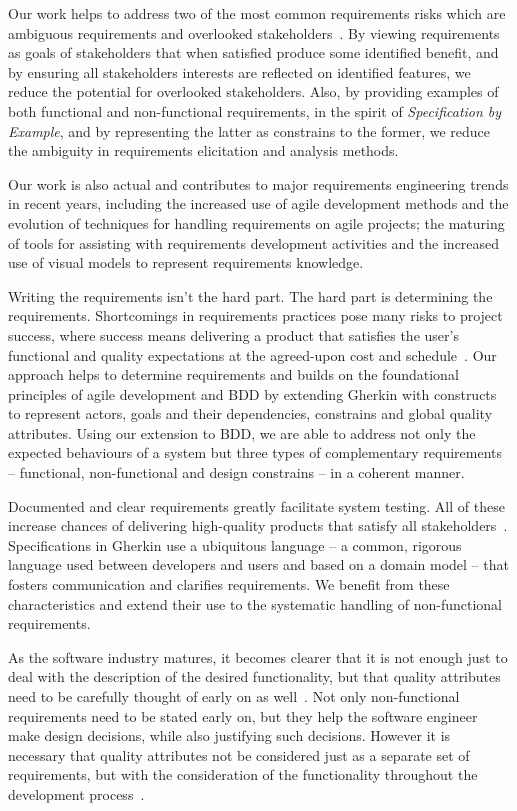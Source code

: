 \documentclass[dissertation,final]{softeng}
\newcommand{\nfrs}{non-functional requirements\xspace}
\begin{document}
Our work helps to address two of the most common requirements risks which are ambiguous requirements and overlooked stakeholders~\citep[p. 20]{Wiegers2013}. By viewing requirements as goals of stakeholders that when satisfied produce some identified benefit, and by ensuring all stakeholders interests are reflected on identified features, we reduce the potential for overlooked stakeholders. Also, by providing examples of both functional and \nfrs, in the spirit of \emph{Specification by Example}, and by representing the latter as constrains to the former, we reduce the ambiguity in requirements elicitation and analysis methods.

Our work is also actual and contributes to major requirements engineering trends in recent years, including the increased use of agile development methods and the evolution of techniques for handling requirements on agile projects; the maturing of tools for assisting with requirements development activities and the increased use of visual models to represent requirements knowledge.

Writing the requirements isn't the hard part. The hard part is determining the requirements. Shortcomings in requirements practices pose many risks to project success, where success means delivering a product that satisfies the user's functional and quality expectations at the agreed-upon cost and schedule~\citep{Wiegers2013}. Our approach helps to determine requirements and builds on the foundational principles of agile development and BDD by extending Gherkin with constructs to represent actors, goals and their dependencies, constrains and global quality attributes. Using our extension to BDD, we are able to address not only the expected behaviours of a system but three types of complementary requirements~\citep{Leffingwell2011} -- functional, non-functional and design constrains -- in a coherent manner.

Documented and clear requirements greatly facilitate system testing. All of these increase chances of delivering high-quality products that satisfy all stakeholders~\citep{Wiegers2013}. Specifications in Gherkin use a ubiquitous language -- a common, rigorous language used between developers and users and based on a domain model -- that fosters communication and clarifies requirements. We benefit from these characteristics and extend their use to the systematic handling of \nfrs.

As the software industry matures, it becomes clearer that it is not enough just to deal with the description of the desired functionality, but that quality attributes need to be carefully thought of early on as well~\citep{Chung:2009vg}. Not only non-functional requirements need to be stated early on, but they help the software engineer make design decisions, while also justifying such decisions. However it is necessary that quality attributes not be considered just as a separate set of requirements, but with the consideration of the functionality throughout the development process~\citep{Chung:2009vg}.
\end{document}
